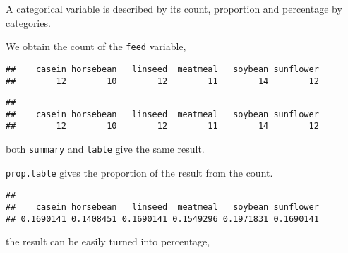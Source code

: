 \documentclass[]{book}
\newenvironment{Shaded}{\begin{snugshade}}{\end{snugshade}}
\newcommand{\KeywordTok}[1]{\textcolor[rgb]{0.13,0.29,0.53}{\textbf{{#1}}}}
\newcommand{\DecValTok}[1]{\textcolor[rgb]{0.00,0.00,0.81}{{#1}}}
\newcommand{\NormalTok}[1]{{#1}}
\theoremstyle{definition}
\theoremstyle{definition}
\theoremstyle{remark}
\begin{document}
A categorical variable is described by its count, proportion and
percentage by categories.

We obtain the count of the \texttt{feed} variable,

\begin{Shaded}
\end{Shaded}

\begin{verbatim}
##    casein horsebean   linseed  meatmeal   soybean sunflower 
##        12        10        12        11        14        12
\end{verbatim}

\begin{Shaded}
\end{Shaded}

\begin{verbatim}
## 
##    casein horsebean   linseed  meatmeal   soybean sunflower 
##        12        10        12        11        14        12
\end{verbatim}

both \texttt{summary} and \texttt{table} give the same result.

\texttt{prop.table} gives the proportion of the result from the count.

\begin{Shaded}
\end{Shaded}

\begin{verbatim}
## 
##    casein horsebean   linseed  meatmeal   soybean sunflower 
## 0.1690141 0.1408451 0.1690141 0.1549296 0.1971831 0.1690141
\end{verbatim}

the result can be easily turned into percentage,

\begin{Shaded}
\end{Shaded}
\end{document}
